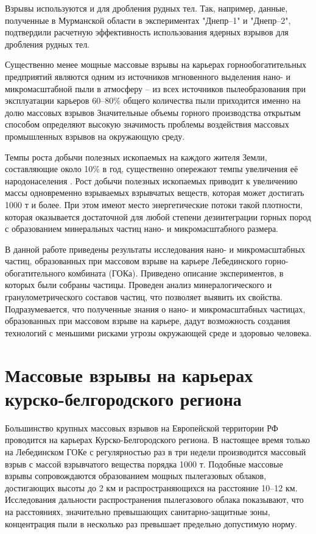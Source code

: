 Взрывы используются и для дробления рудных тел. Так, например, данные, полученные в Мурманской области в экспериментах "Днепр–1" и "Днепр–2", подтвердили расчетную эффективность использования ядерных взрывов для дробления рудных тел. 

Существенно менее мощные массовые взрывы на карьерах горнообогатительных предприятий являются одним из источников мгновенного выделения нано- и микромасштабной пыли в атмосферу – из всех источников пылеобразования при эксплуатации карьеров 60–80\% общего количества пыли приходится именно на долю массовых взрывов \cite{bib01,bib01} Значительные объемы горного производства открытым способом определяют высокую значимость проблемы воздействия массовых промышленных взрывов на окружающую среду.

Темпы роста добычи полезных ископаемых на каждого жителя Земли, составляющие около 10\% в год, существенно опережают темпы увеличения её народонаселения \cite{bib09}. Рост добычи полезных ископаемых приводит к увеличению массы одновременно взрываемых взрывчатых веществ, которая может достигать 1000 т и более. При этом имеют место энергетические потоки такой плотности, которая оказывается достаточной для любой степени дезинтеграции горных пород с образованием минеральных частиц нано- и микромасштабного размера.

В данной работе приведены результаты исследования нано- и микромасштабных частиц, образованных при массовом взрыве на карьере Лебединского горно-обогатительного комбината (ГОКа). Приведено описание экспериментов, в которых были собраны частицы. Проведен анализ минералогического и гранулометрического составов частиц, что позволяет выявить их свойства. Подразумевается, что полученные знания о нано- и микромасштабных частицах, образованных при массовом взрыве на карьере, дадут возможность создания технологий с меньшими рисками угрозы окружающей среде и здоровью человека.

\section{Массовые взрывы на карьерах курско-белгородского региона} \label{sect2_2}


Большинство крупных массовых взрывов на Европейской территории РФ проводится на карьерах Курско-Белгородского региона. В настоящее время только на Лебединском ГОКе с регулярностью раз в три недели производится массовый взрыв с массой взрывчатого вещества порядка 1000 т. Подобные массовые взрывы сопровождаются образованием мощных пылегазовых облаков, достигающих высоты до 2 км и распространяющихся на расстояние 10–12 км. Исследования дальности распространения пылегазового облака показывают, что на расстояниях, значительно превышающих санитарно-защитные зоны, концентрация пыли в несколько раз превышает предельно допустимую норму.

